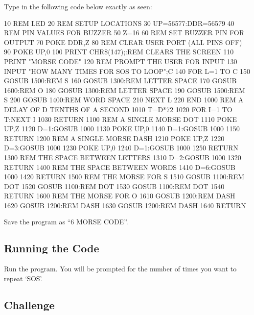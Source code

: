Type in the following code below exactly as seen:
\begin{basic}
10 REM LED
20 REM SETUP LOCATIONS
30 UP=56577:DDR=56579
40 REM PIN VALUES FOR BUZZER
50 Z=16
60 REM SET BUZZER PIN FOR OUTPUT
70 POKE DDR,Z
80 REM CLEAR USER PORT (ALL PINS OFF)
90 POKE UP,0
100 PRINT CHR\$(147);:REM CLEARS THE SCREEN
110 PRINT "MORSE CODE"
120 REM PROMPT THE USER FOR INPUT
130 INPUT "HOW MANY TIMES FOR SOS TO LOOP";C
140 FOR L=1 TO C
150 GOSUB 1500:REM S
160 GOSUB 1300:REM LETTER SPACE
170 GOSUB 1600:REM O
180 GOSUB 1300:REM LETTER SPACE
190 GOSUB 1500:REM S
200 GOSUB 1400:REM WORD SPACE
210 NEXT L
220 END
1000 REM A DELAY OF D TENTHS OF A SECOND
1010 T=D*72
1020 FOR I=1 TO T:NEXT I
1030 RETURN
1100 REM A SINGLE MORSE DOT
1110 POKE UP,Z
1120 D=1:GOSUB 1000
1130 POKE UP,0
1140 D=1:GOSUB 1000
1150 RETURN
1200 REM A SINGLE MORSE DASH
1210 POKE UP,Z
1220 D=3:GOSUB 1000
1230 POKE UP,0
1240 D=1:GOSUB 1000
1250 RETURN
1300 REM THE SPACE BETWEEN LETTERS
1310 D=2:GOSUB 1000
1320 RETURN
1400 REM THE SPACE BETWEEN WORDS
1410 D=6:GOSUB 1000
1420 RETURN
1500 REM THE MORSE FOR S
1510 GOSUB 1100:REM DOT
1520 GOSUB 1100:REM DOT
1530 GOSUB 1100:REM DOT
1540 RETURN
1600 REM THE MORSE FOR O
1610 GOSUB 1200:REM DASH
1620 GOSUB 1200:REM DASH
1630 GOSUB 1200:REM DASH
1640 RETURN
\end{basic}

Save the program as ``6 MORSE CODE''.

\subsection*{Running the Code}

Run the program.  You will be prompted for the number of times you want to repeat `SOS'.

\subsection*{Challenge}

